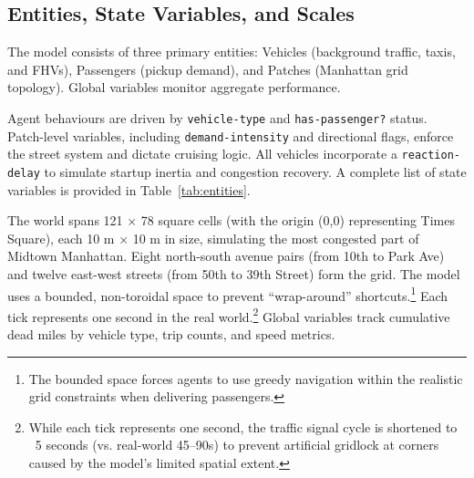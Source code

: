 \documentclass{article}
\begin{document}
\subsection{Entities, State Variables, and Scales}


The model consists of three primary entities: Vehicles (background traffic, taxis, and FHVs), Passengers (pickup demand), and Patches (Manhattan grid topology). Global variables monitor aggregate performance.

Agent behaviours are driven by \texttt{vehicle-type} and \texttt{has-passenger?} status. Patch-level variables, including \texttt{demand-intensity} and directional flags, enforce the street system and dictate cruising logic. All vehicles incorporate a \texttt{reaction-delay} to simulate startup inertia and congestion recovery. A complete list of state variables is provided in Table~\ref{tab:entities}.

The world spans 121 × 78 square cells (with the origin (0,0) representing Times Square), each 10 m × 10 m in size, simulating the most congested part of Midtown Manhattan. Eight north-south avenue pairs (from 10th to Park Ave) and twelve east-west streets (from 50th to 39th Street) form the grid. The model uses a bounded, non-toroidal space to prevent ``wrap-around'' shortcuts.\footnote{The bounded space forces agents to use greedy navigation within the realistic grid constraints when delivering passengers.} Each tick represents one second in the real world.\footnote{While each tick represents one second, the traffic signal cycle is shortened to ~5 seconds (vs. real-world 45–90s) to prevent artificial gridlock at corners caused by the model's limited spatial extent.} Global variables track cumulative dead miles by vehicle type, trip counts, and speed metrics.
\end{document}

